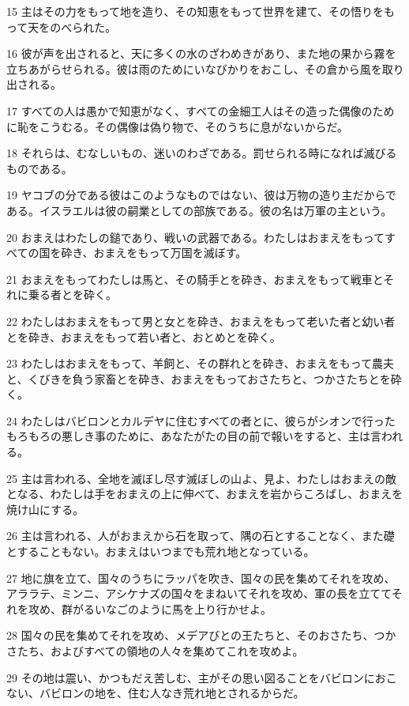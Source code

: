 \par 15 主はその力をもって地を造り、その知恵をもって世界を建て、その悟りをもって天をのべられた。
\par 16 彼が声を出されると、天に多くの水のざわめきがあり、また地の果から霧を立ちあがらせられる。彼は雨のためにいなびかりをおこし、その倉から風を取り出される。
\par 17 すべての人は愚かで知恵がなく、すべての金細工人はその造った偶像のために恥をこうむる。その偶像は偽り物で、そのうちに息がないからだ。
\par 18 それらは、むなしいもの、迷いのわざである。罰せられる時になれば滅びるものである。
\par 19 ヤコブの分である彼はこのようなものではない、彼は万物の造り主だからである。イスラエルは彼の嗣業としての部族である。彼の名は万軍の主という。
\par 20 おまえはわたしの鎚であり、戦いの武器である。わたしはおまえをもってすべての国を砕き、おまえをもって万国を滅ぼす。
\par 21 おまえをもってわたしは馬と、その騎手とを砕き、おまえをもって戦車とそれに乗る者とを砕く。
\par 22 わたしはおまえをもって男と女とを砕き、おまえをもって老いた者と幼い者とを砕き、おまえをもって若い者と、おとめとを砕く。
\par 23 わたしはおまえをもって、羊飼と、その群れとを砕き、おまえをもって農夫と、くびきを負う家畜とを砕き、おまえをもっておさたちと、つかさたちとを砕く。
\par 24 わたしはバビロンとカルデヤに住むすべての者とに、彼らがシオンで行ったもろもろの悪しき事のために、あなたがたの目の前で報いをすると、主は言われる。
\par 25 主は言われる、全地を滅ぼし尽す滅ぼしの山よ、見よ、わたしはおまえの敵となる、わたしは手をおまえの上に伸べて、おまえを岩からころばし、おまえを焼け山にする。
\par 26 主は言われる、人がおまえから石を取って、隅の石とすることなく、また礎とすることもない。おまえはいつまでも荒れ地となっている。
\par 27 地に旗を立て、国々のうちにラッパを吹き、国々の民を集めてそれを攻め、アララテ、ミンニ、アシケナズの国々をまねいてそれを攻め、軍の長を立ててそれを攻め、群がるいなごのように馬を上り行かせよ。
\par 28 国々の民を集めてそれを攻め、メデアびとの王たちと、そのおさたち、つかさたち、およびすべての領地の人々を集めてこれを攻めよ。
\par 29 その地は震い、かつもだえ苦しむ、主がその思い図ることをバビロンにおこない、バビロンの地を、住む人なき荒れ地とされるからだ。
